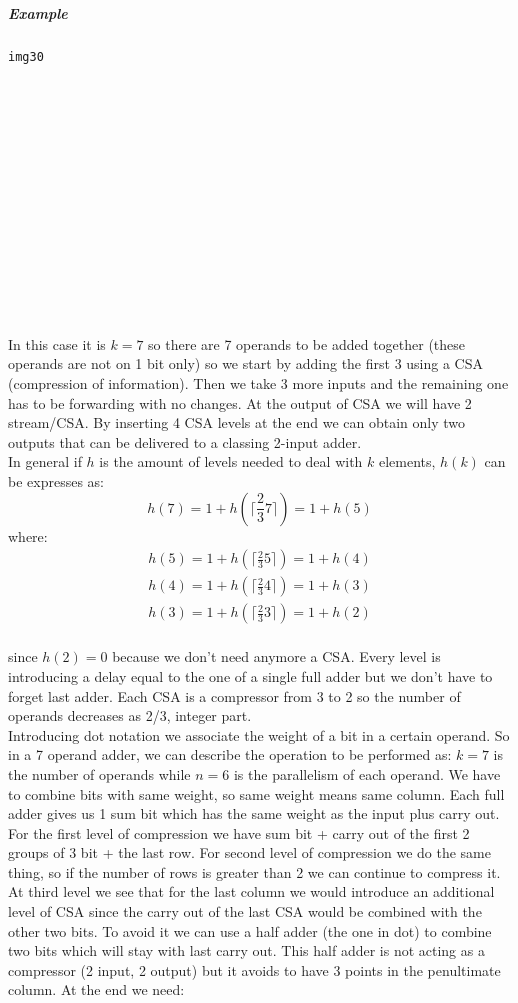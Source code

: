 \subparagraph{Example}
\begin{verbatim}
img30














\end{verbatim}
In this case it is $k=7$ so there are 7 operands to be added together (these operands are not on 1 bit only) so we start by adding the first 3 using a CSA (compression of information). Then we take 3 more inputs and the remaining one has to be forwarding with no changes. At the output of CSA we will have 2 stream/CSA. By inserting 4 CSA levels at the end we can obtain only two outputs that can be delivered to a classing 2-input adder.\\

In general if $h$ is the amount of levels needed to deal with $k$ elements, $h(k)$ can be expresses as:
$$h(7)=1+h(\lceil \frac{2}{3}7 \rceil )=1+h(5)$$
where:
\begin{eqnarray}
h(5)=1+h(\lceil \frac{2}{3}5 \rceil )=1+h(4)\\
h(4)=1+h(\lceil \frac{2}{3}4 \rceil )=1+h(3)\\
h(3)=1+h(\lceil \frac{2}{3}3 \rceil )=1+h(2)\\
\end{eqnarray}

since $h(2)=0$ because we don't need anymore a CSA. Every level is introducing a delay equal to the one of a single full adder but we don't have to forget last adder.
Each CSA is a compressor from 3 to 2 so the number of operands decreases as 2/3, integer part.\\

Introducing dot notation we associate the weight of a bit in a certain operand. So in a 7 operand adder, we can describe the operation to be performed as:
$k=7$ is the number of operands while $n=6$ is the parallelism of each operand.
We have to combine bits with same weight, so same weight means same column. Each full adder gives us 1 sum bit which has the same weight as the input plus carry out. For the first level of compression we have sum bit + carry out of the first 2 groups of 3 bit + the last row.
For second level of compression we do the same thing, so if the number of rows is greater than 2 we can continue to compress it.
At third level we see that for the last column we would introduce an additional level of CSA since the carry out of the last CSA would be combined with the other two bits. To avoid it we can use a half adder (the one in dot) to combine two bits which will stay with last carry out. This half adder is not acting as a compressor (2 input, 2 output) but it avoids to have 3 points in the penultimate column. At the end we need:

